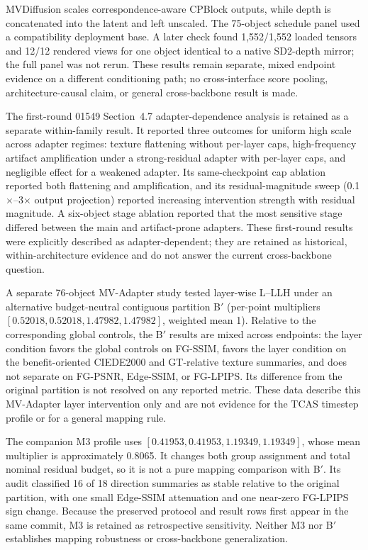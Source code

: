 \documentclass[11pt]{article}
\begin{document}
MVDiffusion scales correspondence-aware CPBlock outputs, while depth is concatenated into the latent and left unscaled. The 75-object schedule panel used a compatibility deployment base. A later check found 1,552/1,552 loaded tensors and 12/12 rendered views for one object identical to a native SD2-depth mirror; the full panel was not rerun. These results remain separate, mixed endpoint evidence on a different conditioning path; no cross-interface score pooling, architecture-causal claim, or general cross-backbone result is made.

The first-round 01549 Section~4.7 adapter-dependence analysis is retained as a separate within-family result. It reported three outcomes for uniform high scale across adapter regimes: texture flattening without per-layer caps, high-frequency artifact amplification under a strong-residual adapter with per-layer caps, and negligible effect for a weakened adapter. Its same-checkpoint cap ablation reported both flattening and amplification, and its residual-magnitude sweep (0.1$\times$--3$\times$ output projection) reported increasing intervention strength with residual magnitude. A six-object stage ablation reported that the most sensitive stage differed between the main and artifact-prone adapters. These first-round results were explicitly described as adapter-dependent; they are retained as historical, within-architecture evidence and do not answer the current cross-backbone question.

A separate 76-object MV-Adapter study tested layer-wise L--LLH under an alternative budget-neutral contiguous partition B$'$ (per-point multipliers $[0.52018,0.52018,1.47982,1.47982]$, weighted mean 1). Relative to the corresponding global controls, the B$'$ results are mixed across endpoints: the layer condition favors the global controls on FG-SSIM, favors the layer condition on the benefit-oriented CIEDE2000 and GT-relative texture summaries, and does not separate on FG-PSNR, Edge-SSIM, or FG-LPIPS. Its difference from the original partition is not resolved on any reported metric. These data describe this MV-Adapter layer intervention only and are not evidence for the TCAS timestep profile or for a general mapping rule.

The companion M3 profile uses $[0.41953,0.41953,1.19349,1.19349]$, whose mean multiplier is approximately 0.8065. It changes both group assignment and total nominal residual budget, so it is not a pure mapping comparison with B$'$. Its audit classified 16 of 18 direction summaries as stable relative to the original partition, with one small Edge-SSIM attenuation and one near-zero FG-LPIPS sign change. Because the preserved protocol and result rows first appear in the same commit, M3 is retained as retrospective sensitivity. Neither M3 nor B$'$ establishes mapping robustness or cross-backbone generalization.
\end{document}
